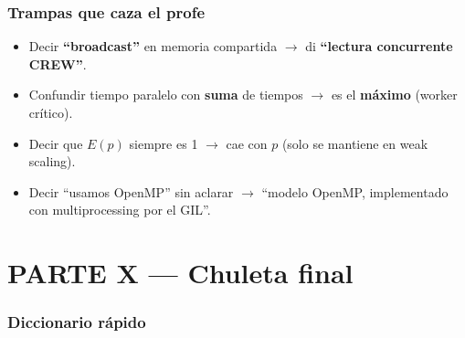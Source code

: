 \documentclass[11pt,a4paper]{article}
\begin{document}
\section{Trampas que caza el profe}

\begin{itemize}
  \item Decir \textbf{``broadcast''} en memoria compartida $\to$ di
        \textbf{``lectura concurrente CREW''}.
  \item Confundir tiempo paralelo con \textbf{suma} de tiempos $\to$ es el
        \textbf{máximo} (worker crítico).
  \item Decir que $E(p)$ siempre es 1 $\to$ cae con $p$ (solo se mantiene en
        weak scaling).
  \item Decir ``usamos OpenMP'' sin aclarar $\to$ ``modelo OpenMP, implementado
        con multiprocessing por el GIL''.
\end{itemize}

\part*{PARTE X --- Chuleta final}

\section{Diccionario rápido}
\end{document}
